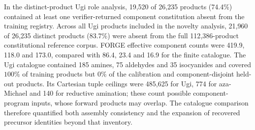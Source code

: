 \documentclass{article}
\theoremstyle{definition}
\newcommand{\ForgeNovelAgainstFullCount}{21{,}960}
\newcommand{\ForgeNovelAgainstFullDenominator}{26{,}235}
\newcommand{\ForgeNovelAgainstFullPercent}{83.7}
\newcommand{\ForgeOffRegistryCount}{19{,}520}
\newcommand{\ForgeOffRegistryDenominator}{26{,}235}
\newcommand{\ForgeOffRegistryPercent}{74.4}
\newcommand{\ForgeProseCatalogueBLTupleCeiling}{774}
\newcommand{\ForgeProseCatalogueCatalogueBLEffectiveComponentCount}{23.4}
\newcommand{\ForgeProseCatalogueCatalogueLXEffectiveComponentCount}{16.9}
\newcommand{\ForgeProseCatalogueCatalogueUgiEffectiveComponentCount}{86.4}
\newcommand{\ForgeProseCatalogueForgeBLEffectiveComponentCount}{118.0}
\newcommand{\ForgeProseCatalogueForgeLXEffectiveComponentCount}{173.0}
\newcommand{\ForgeProseCatalogueForgeUgiEffectiveComponentCount}{419.9}
\newcommand{\ForgeProseCatalogueHeldCoveragePercent}{0}
\newcommand{\ForgeProseCatalogueLXTupleCeiling}{140}
\newcommand{\ForgeProseCatalogueTrainCoveragePercent}{100}
\newcommand{\ForgeProseCatalogueUgiAldehydeCount}{75}
\newcommand{\ForgeProseCatalogueUgiAmineCount}{185}
\newcommand{\ForgeProseCatalogueUgiIsocyanideCount}{35}
\newcommand{\ForgeProseCatalogueUgiTupleCeiling}{485{,}625}
\newcommand{\ForgeProseFullReferenceSize}{112{,}386}
\begin{document}
In the distinct-product Ugi role analysis, \ForgeOffRegistryCount{} of
\ForgeOffRegistryDenominator{} products (\ForgeOffRegistryPercent\%) contained at least one
verifier-returned component constitution absent from the training registry. Across all Ugi products
included in the novelty analysis, \ForgeNovelAgainstFullCount{} of
\ForgeNovelAgainstFullDenominator{} distinct products (\ForgeNovelAgainstFullPercent\%) were absent
from the full \ForgeProseFullReferenceSize{}-product constitutional reference corpus. FORGE effective
component counts were \ForgeProseCatalogueForgeUgiEffectiveComponentCount{},
\ForgeProseCatalogueForgeBLEffectiveComponentCount{} and
\ForgeProseCatalogueForgeLXEffectiveComponentCount{}, compared with
\ForgeProseCatalogueCatalogueUgiEffectiveComponentCount{},
\ForgeProseCatalogueCatalogueBLEffectiveComponentCount{} and
\ForgeProseCatalogueCatalogueLXEffectiveComponentCount{} for the finite catalogue. The Ugi catalogue
contained \ForgeProseCatalogueUgiAmineCount{} amines,
\ForgeProseCatalogueUgiAldehydeCount{} aldehydes and
\ForgeProseCatalogueUgiIsocyanideCount{} isocyanides and covered
$\ForgeProseCatalogueTrainCoveragePercent\%$ of training products but
$\ForgeProseCatalogueHeldCoveragePercent\%$ of the calibration and component-disjoint held-out
products. Its Cartesian tuple ceilings were \ForgeProseCatalogueUgiTupleCeiling{} for Ugi,
\ForgeProseCatalogueBLTupleCeiling{} for aza-Michael and
\ForgeProseCatalogueLXTupleCeiling{} for reductive amination; these count possible
component-program inputs, whose forward products may overlap. The catalogue comparison therefore
quantified both assembly consistency and the expansion of recovered precursor identities beyond
that inventory.
\end{document}
